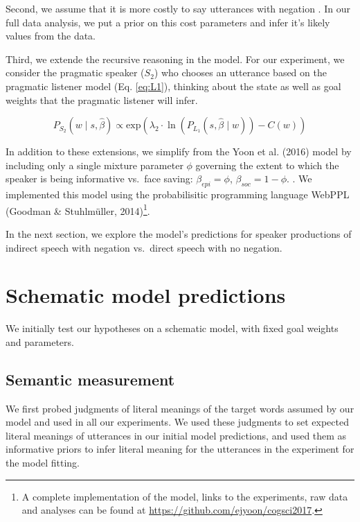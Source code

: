 \documentclass[10pt, letterpaper]{article}
\begin{document}
Second, we assume that it is more costly to say utterances with negation
. In our full data analysis, we put a prior on
this cost parameters and infer it's likely values from the data.

Third, we extende the recursive reasoning in the model. For our
experiment, we consider the pragmatic speaker (\(S_2\)) who chooses an
utterance based on the pragmatic listener model (Eq. \ref{eq:L1}),
thinking about the state as well as goal weights that the pragmatic
listener will infer.

\[P_{S_2}(w \mid s, \hat{\beta})\propto \mathrm{exp}(\lambda_{2} \cdot \ln(P_{L_1}(s,  \hat{\beta} \mid w)) - C(w))\]

In addition to these extensions, we simplify from the Yoon et al. (2016)
model by including only a single mixture parameter \(\phi\) governing
the extent to which the speaker is being informative vs.~face saving:
\(\beta_{epi} = \phi\), \(\beta_{soc} = 1 - \phi\).
.
We implemented this model using the probabilisitic programming language
WebPPL (Goodman \& Stuhlmüller,
2014)\footnote{A complete implementation of the model, links to the experiments, raw data and analyses can be found at \url{https://github.com/ejyoon/cogsci2017}.}.

In the next section, we explore the model's predictions for speaker
productions of indirect speech with negation vs.~direct speech with no
negation.

\section{Schematic model predictions}\label{schematic-model-predictions}

We initially test our hypotheses on a schematic model, with fixed goal
weights and parameters.

\subsection{Semantic measurement}\label{semantic-measurement}

We first probed judgments of literal meanings of the target words
assumed by our model and used in all our experiments. We used these
judgments to set expected literal meanings of utterances in our initial
model predictions, and used them as informative priors to infer literal
meaning for the utterances in the experiment for the model fitting.
\end{document}
